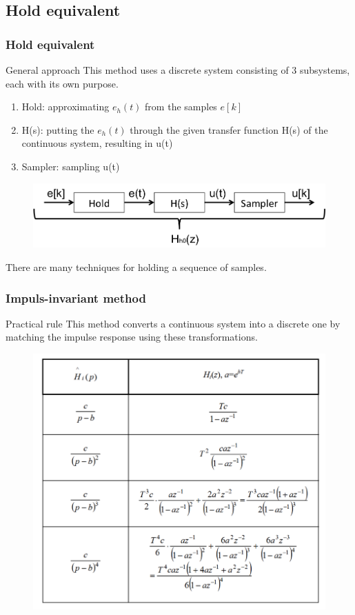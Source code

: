 \subsection{Hold equivalent}
\begin{frame}
	\frametitle{Hold equivalent}
	\begin{block}{General approach}
		This method uses a discrete system consisting of 3 subsystems, each with its own purpose. 
		\begin{enumerate}
			\item Hold: approximating $e_h(t)$ from the samples $e[k]$
			\item H(s): putting the $e_h(t)$ through the given transfer function H(s) of the continuous system, resulting in u(t)
			\item Sampler: sampling u(t) 
		\end{enumerate}
		\vspace{-1em}
		\begin{figure}
			\centering
			\includegraphics[width=0.8\linewidth]{hold_equivalent}
		\end{figure}
		\vspace{-1em}
		There are many techniques for holding a sequence of samples.
	\end{block}
\end{frame}

\begin{frame}
	\frametitle{Impuls-invariant method}
	\begin{block}{Practical rule}
		This method converts a continuous system into a discrete one by matching the impulse response using these transformations.
		\vspace{-1em}
		\begin{figure}
			\centering
			\includegraphics[width=0.5\linewidth]{impuls_inv}
		\end{figure}
	\end{block}
\end{frame}

